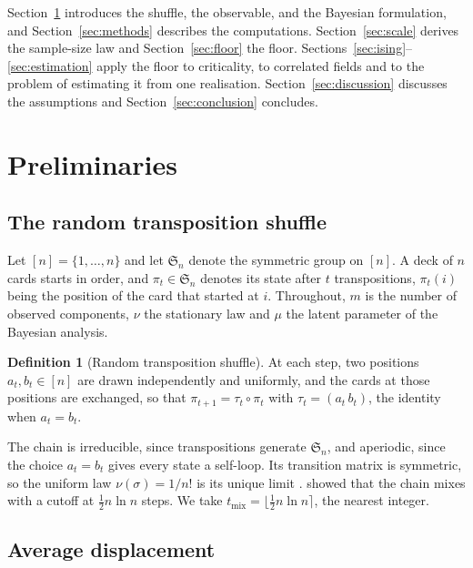\documentclass[ba]{imsart}
\theoremstyle{plain}
\theoremstyle{definition}
\newtheorem{definition}[theorem]{Definition}
\newcommand{\Sym}{\mathfrak{S}}
\begin{document}
Section~\ref{sec:prelim} introduces the shuffle, the observable, and the Bayesian formulation, and Section~\ref{sec:methods} describes the computations. Section~\ref{sec:scale} derives the sample-size law and Section~\ref{sec:floor} the floor. Sections~\ref{sec:ising}--\ref{sec:estimation} apply the floor to criticality, to correlated fields and to the problem of estimating it from one realisation. Section~\ref{sec:discussion} discusses the assumptions and Section~\ref{sec:conclusion} concludes.

\section{Preliminaries}\label{sec:prelim}

\subsection{The random transposition shuffle}

Let $[n]=\{1,\dots,n\}$ and let $\Sym_n$ denote the symmetric group on $[n]$. A deck of $n$ cards starts in order, and $\pi_t\in\Sym_n$ denotes its state after $t$ transpositions, $\pi_t(i)$ being the position of the card that started at $i$. Throughout, $m$ is the number of observed components, $\nu$ the stationary law and $\mu$ the latent parameter of the Bayesian analysis.

\begin{definition}[Random transposition shuffle]\label{def:shuffle}
At each step, two positions $a_t,b_t\in[n]$ are drawn independently and uniformly, and the cards at those positions are exchanged, so that $\pi_{t+1}=\tau_t\circ\pi_t$ with $\tau_t=(a_t\,b_t)$, the identity when $a_t=b_t$.
\end{definition}

The chain is irreducible, since transpositions generate $\Sym_n$, and aperiodic, since the choice $a_t=b_t$ gives every state a self-loop. Its transition matrix is symmetric, so the uniform law $\nu(\sigma)=1/n!$ is its unique limit \citep{LevinPeresWilmer2009}. \citet{DiaconisShahshahani1981} showed that the chain mixes with a cutoff at $\tfrac12 n\ln n$ steps. We take $t_{\mathrm{mix}}=\lfloor\tfrac12 n\ln n\rceil$, the nearest integer.

\subsection{Average displacement}
\end{document}
